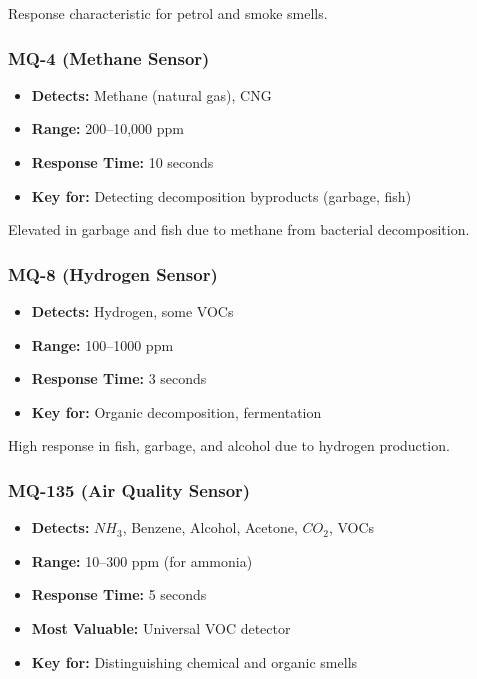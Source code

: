 \documentclass[10pt]{article}
\begin{document}
Response characteristic for petrol and smoke smells.

\subsubsection{MQ-4 (Methane Sensor)}

\begin{itemize}
    \item \textbf{Detects:} Methane (natural gas), CNG
    \item \textbf{Range:} 200–10,000 ppm
    \item \textbf{Response Time:} 10 seconds
    \item \textbf{Key for:} Detecting decomposition byproducts (garbage, fish)
\end{itemize}

Elevated in garbage and fish due to methane from bacterial decomposition.

\subsubsection{MQ-8 (Hydrogen Sensor)}

\begin{itemize}
    \item \textbf{Detects:} Hydrogen, some VOCs
    \item \textbf{Range:} 100–1000 ppm
    \item \textbf{Response Time:} 3 seconds
    \item \textbf{Key for:} Organic decomposition, fermentation
\end{itemize}

High response in fish, garbage, and alcohol due to hydrogen production.

\subsubsection{MQ-135 (Air Quality Sensor)}

\begin{itemize}
    \item \textbf{Detects:} $NH_3$, Benzene, Alcohol, Acetone, $CO_2$, VOCs
    \item \textbf{Range:} 10–300 ppm (for ammonia)
    \item \textbf{Response Time:} 5 seconds
    \item \textbf{Most Valuable:} Universal VOC detector
    \item \textbf{Key for:} Distinguishing chemical and organic smells
\end{itemize}
\end{document}
